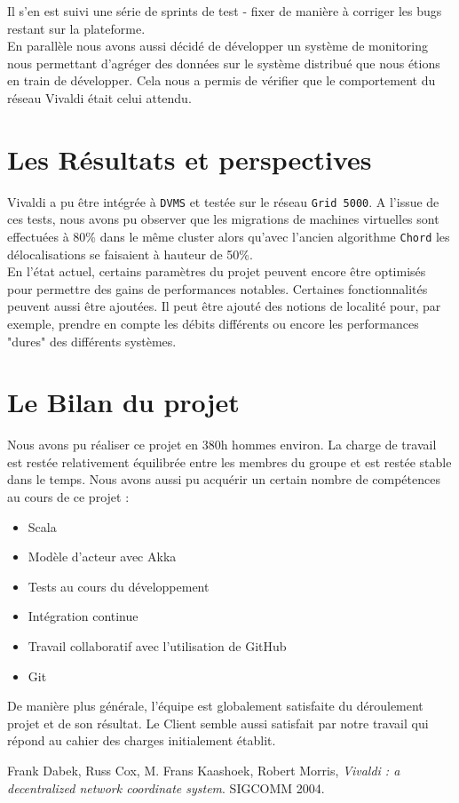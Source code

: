 \documentclass[11pt,a4paper]{article}
\begin{document}
Il s'en est suivi une série de sprints de test - fixer de manière à corriger les bugs restant sur la plateforme.\\

En parallèle nous avons aussi décidé de développer un système de monitoring nous permettant d'agréger des données sur le système distribué que nous étions en train de développer. Cela nous a permis de vérifier que le comportement du réseau Vivaldi était celui attendu.

\section{Les Résultats et perspectives}
Vivaldi a pu être intégrée à \texttt{DVMS} et testée sur le réseau \texttt{Grid 5000}. A l'issue de ces tests, nous avons pu observer que les migrations de machines virtuelles sont effectuées à 80\% dans le même cluster alors qu'avec l'ancien algorithme \texttt{Chord} les délocalisations se faisaient à hauteur de 50\%.\\

En l'état actuel, certains paramètres du projet peuvent encore être optimisés pour permettre des gains de performances notables. Certaines fonctionnalités peuvent aussi être ajoutées. Il peut être ajouté des notions de localité pour, par exemple, prendre en compte les débits différents ou encore les performances "dures" des différents systèmes.

\section{Le Bilan du projet}
Nous avons pu réaliser ce projet en 380h hommes environ. La charge de travail est restée relativement équilibrée entre les membres du groupe et est restée stable dans le temps. Nous avons aussi pu acquérir un certain nombre de compétences au cours de ce projet :
\begin{itemize}
\item Scala
\item Modèle d'acteur avec Akka
\item Tests au cours du développement
\item Intégration continue
\item Travail collaboratif avec l'utilisation de GitHub
\item Git \\
\end{itemize}

De manière plus générale, l'équipe est globalement satisfaite du déroulement projet et de son résultat. Le Client semble aussi satisfait par notre travail qui répond au cahier des charges initialement établit. 

\begin{thebibliography}{9}

  Frank Dabek, Russ Cox, M. Frans Kaashoek, Robert Morris,
  \emph{Vivaldi : a decentralized network coordinate system}.
  SIGCOMM 2004.

\end{thebibliography}
\end{document}
